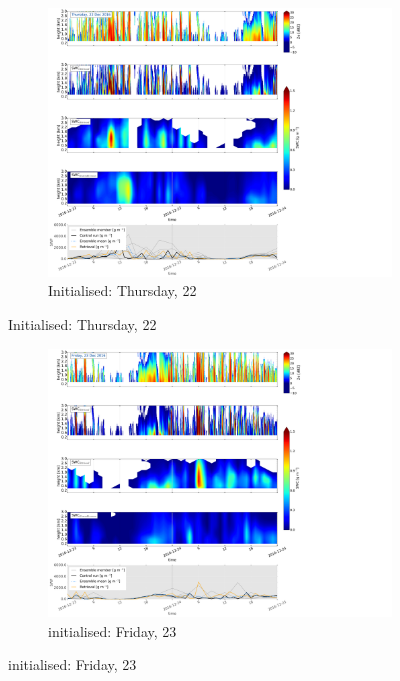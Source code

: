 \begin{figure}[t]\ContinuedFloat
	\centering
	\begin{subfigure}[t]{0.8\textwidth}
		\includegraphics[trim={2.3cm 17.6cm 27.cm 0.5cm},clip,width=\textwidth]{./fig_SWC/20161222}
		\caption{Initialised: Thursday, \SI{22}{\dec}}\label{fig:SWC22}
	\end{subfigure}
\end{figure}
\begin{figure}[t]\ContinuedFloat        
	\centering
	\begin{subfigure}[t]{0.8\textwidth}
		\includegraphics[trim={2.3cm 17.6cm 27.cm 0.5cm},clip,width=\textwidth]{./fig_SWC/20161223}
		\caption{initialised: Friday, \SI{23}{\dec}}\label{fig:SWC23}
	\end{subfigure}
\end{figure}
